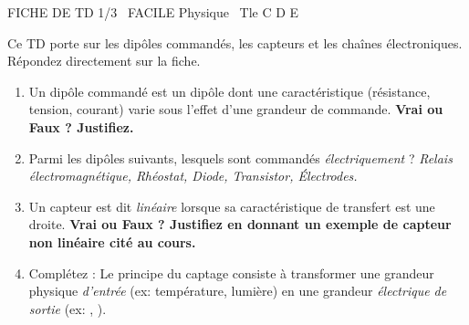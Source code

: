 \documentclass[11pt]{article}
\begin{document}
\begin{tcolorbox}[enhanced,colback=popink,colframe=popink,arc=10pt,boxrule=0pt,left=12pt,right=12pt,top=9pt,bottom=9pt]
{\color{white}\popxbold\small FICHE DE TD 1/3 \textbullet\ FACILE \hfill Physique \textbullet\ Tle C D E\par}
\end{tcolorbox}
\vspace{4pt}
Ce TD porte sur les dipôles commandés, les capteurs et les chaînes électroniques. Répondez directement sur la fiche.

\begin{exercice}
\begin{enumerate}
    \item Un dipôle commandé est un dipôle dont une caractéristique (résistance, tension, courant) varie sous l'effet d'une grandeur de commande. \textbf{Vrai ou Faux ? Justifiez.}
    \item Parmi les dipôles suivants, lesquels sont commandés \textit{électriquement} ? \textit{Relais électromagnétique, Rhéostat, Diode, Transistor, Électrodes.}
    \item Un capteur est dit \textit{linéaire} lorsque sa caractéristique de transfert est une droite. \textbf{Vrai ou Faux ? Justifiez en donnant un exemple de capteur non linéaire cité au cours.}
    \item Complétez : Le principe du captage consiste à transformer une grandeur physique \textit{d'entrée} (ex: température, lumière) en une grandeur \textit{électrique de sortie} (ex: \underline{\hspace{3cm}}, \underline{\hspace{3cm}}).
\end{enumerate}
\end{exercice}
\end{document}
